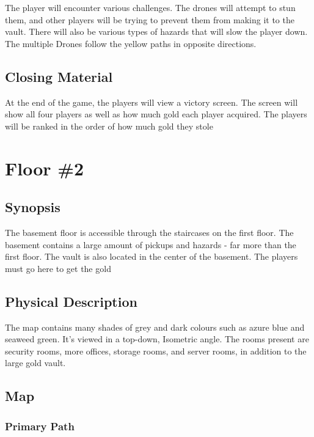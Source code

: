 \documentclass[14pt]{report}
\begin{document}
The player will encounter various challenges. The drones will attempt to stun them, and other players will be trying to prevent them from making it to the vault. There will also be various types of hazards that will slow the player down. The multiple Drones follow the yellow paths in opposite directions.


\subsection{Closing Material}

At the end of the game, the players will view a victory screen. The screen will show all four players as well as how much gold each player acquired. The players will be ranked in the order of how much gold they stole

\section{Floor \#2}

\subsection{Synopsis}

The basement floor is accessible through the staircases on the first floor. The basement contains a large amount of pickups and hazards - far more than the first floor. The vault is also located in the center of the basement. The players must go here to get the gold

\subsection{Physical Description}

The map contains many shades of grey and dark colours such as azure blue and seaweed green. It’s viewed in a top-down, Isometric angle. The rooms present are security rooms, more offices, storage rooms, and server rooms, in addition to the large gold vault.

\subsection{Map}


\subsubsection{Primary Path}
\end{document}
